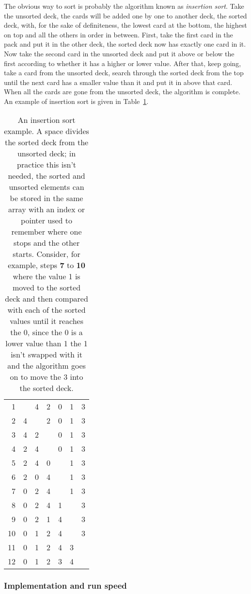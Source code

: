 \documentclass[11pt,a4paper]{scrartcl}
\begin{document}
The obvious way to sort is probably the algorithm known as
\emph{insertion sort}.  Take the unsorted deck, the cards will be
added one by one to another deck, the sorted deck, with, for the sake
of definiteness, the lowest card at the bottom, the highest on top and
all the others in order in between. First, take the first card in the
pack and put it in the other deck, the sorted deck now has exactly one
card in it. Now take the second card in the unsorted deck and put it
above or below the first according to whether it has a higher or lower
value. After that, keep going, take a card from the unsorted deck,
search through the sorted deck from the top until the next card has a
smaller value than it and put it in above that card. When all the
cards are gone from the unsorted deck, the algorithm is complete. An
example of insertion sort is given in Table~\ref{tab_insertsort}.

\begin{table}
\begin{tabular}{r|cccccc}
1&&4&2&0&1&3\\
2&4&&2&0&1&3\\
3&4&2&&0&1&3\\
4&2&4&&0&1&3\\
5&2&4&0&&1&3\\
6&2&0&4&&1&3\\
7&0&2&4&&1&3\\
8&0&2&4&1&&3\\
9&0&2&1&4&&3\\
10&0&1&2&4&&3\\
11&0&1&2&4&3&\\
12&0&1&2&3&4&
\end{tabular}
\caption{An insertion sort example. A space divides the sorted deck
  from the unsorted deck; in practice this isn't needed, the sorted
  and unsorted elements can be stored in the same array with an index
  or pointer used to remember where one stops and the other
  starts. Consider, for example, steps {\bf 7} to {\bf 10} where the
  value 1 is moved to the sorted deck and then compared with each of
  the sorted values until it reaches the 0, since the 0 is a lower
  value than 1 the 1 isn't swapped with it and the algorithm goes on
  to move the 3 into the sorted deck.\label{tab_insertsort}}
\end{table}

\subsubsection{Implementation and run speed}
\end{document}
